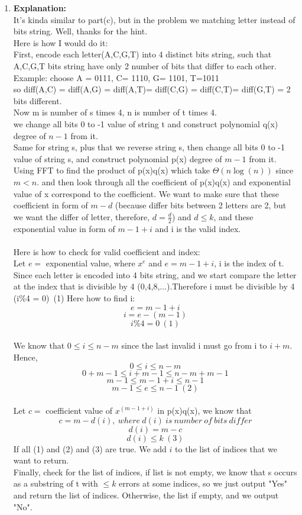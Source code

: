 \documentclass[11pt]{article}
\newenvironment{qparts}{\begin{enumerate}[{(}a{)}]}{\end{enumerate}}
\begin{document}
\begin{qparts}
\item
\noindent
\textbf{Explanation:}\\
It's kinda similar to part(c), but in the problem we matching letter instead of bits string. Well, thanks for the hint.\\
Here is how I would do it:\\
First, encode each letter(A,C,G,T) into 4 distinct bits string, such that A,C,G,T bits string have only 2 number of bits that differ to each other. \\
Example: choose A = 0111, C= 1110, G= 1101, T=1011\\
so diff(A,C) = diff(A,G) = diff(A,T)= diff(C,G) = diff(C,T)= diff(G,T) = 2 bits different.\\
Now m is number of s times 4, n is number of t times 4.\\
we change all bits 0 to -1 value of string t and construct polynomial q(x) degree of $n - 1$ from it.\\
Same for string s, plus that we reverse string s, then change all bits 0 to -1 value of string s, and construct polynomial p(x) degree of $m-1 $ from it.\\
Using FFT to find the product of p(x)q(x) which take $\Theta(n\log(n))$ since $m < n$.  and then look through all the coefficient of p(x)q(x) and exponential value of x correspond to the coefficient. We want to make sure that these coefficient in form of $m-d$ (because differ bits between 2 letters are 2, but we want the differ of letter, therefore, $d = \frac{d}{2}$) and $d \leqslant k$, and these exponential value in form of $m-1 + i$ and i is the valid index.\\
\\
Here is how to check for valid coefficient and index:\\
Let $e = $ exponential value, where $x^e$ and $e =m-1+i$, i is the index of t.\\
Since each letter is encoded into 4 bits string, and we start compare the letter at the index that is divisible by 4 (0,4,8,...).Therefore i must be divisible by 4 (i\%4 = 0)\ (1)
Here how to find i:
$$e = m-1 + i$$
$$i = e- (m-1)$$
$$\boxed{i\%4 = 0}\ (1)$$
\\
We know that $0 \leqslant i \leqslant n-m$ since the last invalid i must go from i to $i + m$. Hence,
$$0 \leqslant i \leqslant n-m$$
$$0 + m-1 \leqslant i + m - 1 \leqslant n-m + m -1$$
$$m-1 \leqslant m - 1 + i \leqslant n -1$$
$$\boxed{m-1 \leqslant e \leqslant n -1}\ (2)$$
\\
Let $c = $ coefficient value of $x^{(m-1+i)}$ in p(x)q(x), we know that
$$c = m  - d(i),\ where\ d(i)\ is\ number\ of\ bits\ differ$$
$$d(i) = m-c$$
$$\boxed{d(i) \leqslant k}\ (3)$$
If all (1) and (2) and (3) are true. We add $i$ to the list of indices that we want to return.\\
Finally, check for the list of indices, if list is not empty, we know that s occurs as a substring of t with $\leqslant k$ errors at some indices, so we just output "Yes" and return the list of indices. Otherwise, the list if empty, and we output "No".\\



\end{qparts}
\end{document}
